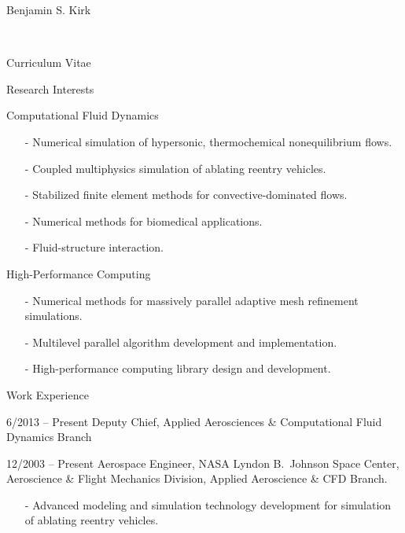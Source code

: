 \documentclass[10pt]{report}
\begin{document}
\begin{cv}{\centerline{\Large Benjamin S. Kirk}\\
    \centerline{\large Curriculum Vitae}}
  \vspace{-.5em}
  \begin{cvlist}{Research Interests}
    \item[Computational Fluid Dynamics] \mbox{ }
      \begin{itemize}
        \item[-] Numerical simulation of hypersonic, thermochemical nonequilibrium flows.
        \item[-] Coupled multiphysics simulation of ablating reentry vehicles.
        \item[-] Stabilized finite element methods for convective-dominated flows.
        \item[-] Numerical methods for biomedical applications.
        \item[-] Fluid-structure interaction.
      \end{itemize}
    \item[High-Performance Computing] \mbox{ }
      \begin{itemize}
        \item[-] Numerical methods for massively parallel adaptive mesh refinement simulations.
        \item[-] Multilevel parallel algorithm development and implementation.
        \item[-] High-performance computing library design and development.
      \end{itemize}
  \end{cvlist}

  \vspace{-.5em}
  \begin{cvlist}{Work Experience}
    \item[6/2013 -- Present]
      Deputy Chief, Applied Aerosciences \& Computational Fluid Dynamics Branch

    \item[12/2003 -- Present]
      Aerospace Engineer, NASA Lyndon B.\ Johnson Space Center, Aeroscience \& Flight Mechanics Division, Applied Aeroscience \& CFD Branch.
      \begin{itemize}
        \item[-]
          Advanced modeling and simulation technology development for simulation of ablating reentry vehicles.


\end{itemize}
\end{cvlist}
\end{cv}
\end{document}
